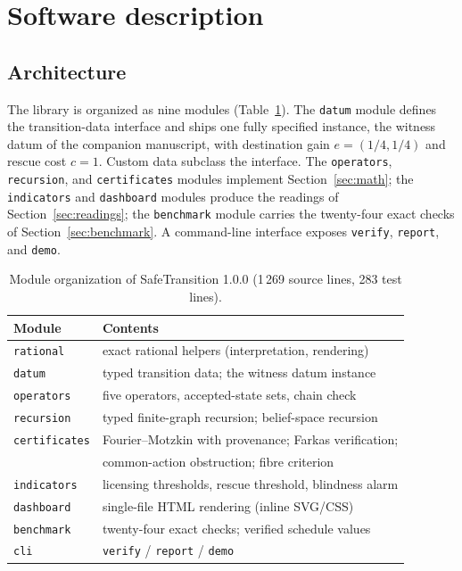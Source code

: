 \documentclass[3p,11pt]{elsarticle}
\begin{document}
\section{Software description}\label{sec:software}

\subsection{Architecture}\label{sec:architecture}

The library is organized as nine modules (Table~\ref{tab:modules}). The
\texttt{datum} module defines the transition-data interface and ships one
fully specified instance, the witness datum of the companion manuscript,
with destination gain $e = (1/4, 1/4)$ and rescue cost $c = 1$. Custom data
subclass the interface. The \texttt{operators}, \texttt{recursion}, and
\texttt{certificates} modules implement Section~\ref{sec:math}; the
\texttt{indicators} and \texttt{dashboard} modules produce the readings of
Section~\ref{sec:readings}; the \texttt{benchmark} module carries the
twenty-four exact checks of Section~\ref{sec:benchmark}. A command-line
interface exposes \texttt{verify}, \texttt{report}, and \texttt{demo}.

\begin{table}[t]
\centering
\small
\begin{tabular}{@{}ll@{}}
\toprule
Module & Contents \\
\midrule
\texttt{rational} & exact rational helpers (interpretation, rendering) \\
\texttt{datum} & typed transition data; the witness datum instance \\
\texttt{operators} & five operators, accepted-state sets, chain check \\
\texttt{recursion} & typed finite-graph recursion; belief-space recursion \\
\texttt{certificates} & Fourier--Motzkin with provenance; Farkas verification; \\
                       & common-action obstruction; fibre criterion \\
\texttt{indicators} & licensing thresholds, rescue threshold, blindness alarm \\
\texttt{dashboard} & single-file HTML rendering (inline SVG/CSS) \\
\texttt{benchmark} & twenty-four exact checks; verified schedule values \\
\texttt{cli} & \texttt{verify} / \texttt{report} / \texttt{demo} \\
\bottomrule
\end{tabular}
\caption{Module organization of SafeTransition 1.0.0
(1\,269 source lines, 283 test lines).}
\label{tab:modules}
\end{table}
\end{document}
